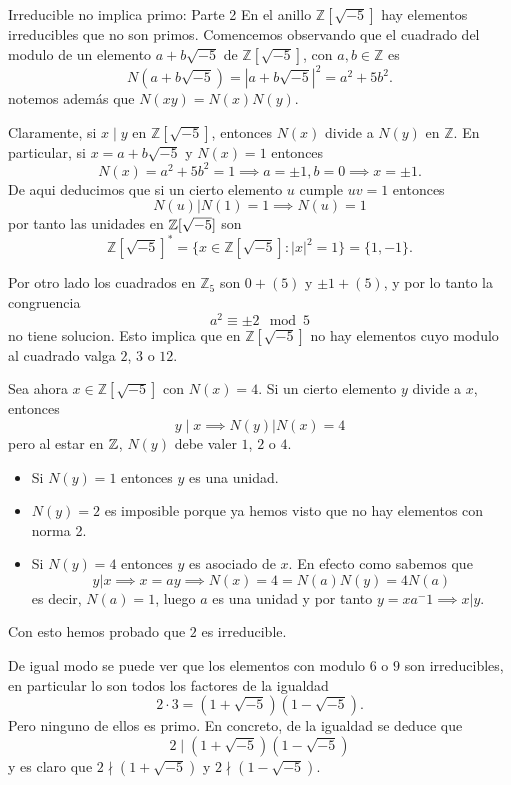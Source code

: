\begin{example}{Irreducible no implica primo: Parte 2}{}
En el anillo \(\mathbb{Z}[\sqrt{-5}]\) hay elementos irreducibles que no son primos. Comencemos observando que el cuadrado del modulo de un elemento \(a + b\sqrt{-5}\) de \(\mathbb{Z}[\sqrt{-5}]\), con \(a, b \in \mathbb{Z}\) es
\[
N(a + b\sqrt{-5}) = |a + b\sqrt{-5}|^2 = a^2 + 5b^2.
\]
notemos además que \(N(xy) = N(x)N(y)\).

Claramente, si \(x \mid y\) en \(\mathbb{Z}[\sqrt{-5}]\), entonces \(N(x)\) divide a \(N(y)\) en \(\mathbb{Z}\). En particular, si \(x = a + b\sqrt{-5}\) y \(N(x) = 1\) entonces
\[
N(x) = a^2 + 5 b^2 = 1 \implies a = \pm 1, b = 0 \implies x = \pm 1.
\]
De aqui deducimos que si un cierto elemento $u$ cumple $uv = 1$ entonces
\[
N(u) | N(1) = 1 \implies N(u) = 1
\]
por tanto las unidades en \(\mathbb{Z}[\sqrt{-5}]\) son
\[
\mathbb{Z}[\sqrt{-5}]^* = \{x \in \mathbb{Z}[\sqrt{-5}] : |x|^2 = 1\} = \{1, -1\}.
\]

Por otro lado los cuadrados en \(\mathbb{Z}_5\) son \(0 + (5)\) y \(\pm 1 + (5)\), y por lo tanto la congruencia 
\[
a^2 \equiv \pm 2 \mod 5
\]
no tiene solucion. Esto implica que en \(\mathbb{Z}[\sqrt{-5}]\) no hay elementos cuyo modulo al cuadrado valga \(2\), \(3\) o \(12\).

Sea ahora \(x \in \mathbb{Z}[\sqrt{-5}]\) con \(N(x) = 4\). Si un cierto elemento $y$ divide a $x$, entonces
\[
y \mid x \implies N(y) | N(x) = 4
\]
pero al estar en $\mathbb{Z}$, $N(y)$ debe valer \(1\), \(2\) o \(4\).
\begin{itemize}
    \item Si $N(y) = 1$ entonces $y$ es una unidad.
    \item $N(y) = 2$ es imposible porque ya hemos visto que no hay elementos con norma 2.
    \item Si $N(y) = 4$ entonces $y$ es asociado de $x$. En efecto como sabemos que 
    \[
    y | x \implies x = ay \implies N(x) = 4 = N(a)N(y) = 4 N(a)
    \]
    es decir, $N(a) = 1$, luego $a$ es una unidad y por tanto $y = xa^-1 \implies x | y$.
\end{itemize}
Con esto hemos probado que $2$ es irreducible.

De igual modo se puede ver que los elementos con modulo \(6\) o \(9\) son irreducibles, en particular lo son todos los factores de la igualdad
\[
2 \cdot 3 = (1 + \sqrt{-5})(1 - \sqrt{-5}).
\]
Pero ninguno de ellos es primo. En concreto, de la igualdad se deduce que
\[
2 \mid (1 + \sqrt{-5})(1 - \sqrt{-5})
\]
y es claro que \(2 \nmid (1 + \sqrt{-5})\) y \(2 \nmid (1 - \sqrt{-5})\).
\end{example}


